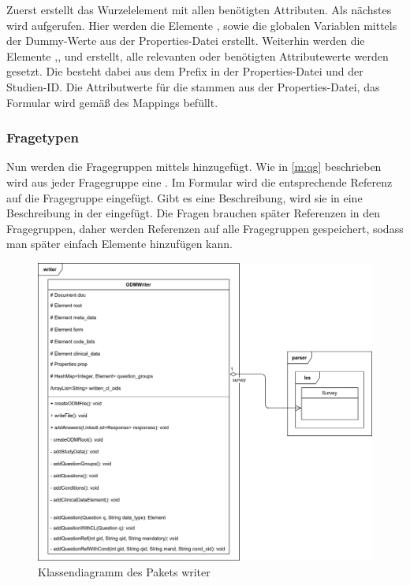 Zuerst erstellt  das Wurzelelement  mit allen benötigten Attributen.
Als nächstes wird  aufgerufen. Hier werden die Elemente , sowie die globalen Variablen mittels der Dummy-Werte aus der Properties-Datei erstellt.
Weiterhin werden die Elemente ,,  und  erstellt, alle relevanten oder benötigten Attributewerte werden gesetzt.
Die  besteht dabei aus dem Prefix in der Properties-Datei und der Studien-ID.
Die Attributwerte für die  stammen aus der Properties-Datei, das Formular wird gemäß des Mappings befüllt.

\subsubsection{Fragetypen}

Nun werden die Fragegruppen mittels  hinzugefügt. Wie in \cref{m:qg} beschrieben wird aus jeder Fragegruppe eine .
Im Formular wird die entsprechende Referenz auf die Fragegruppe eingefügt.
Gibt es eine Beschreibung, wird sie in eine Beschreibung in der  eingefügt.
Die Fragen brauchen später Referenzen in den Fragegruppen, daher werden Referenzen auf alle Fragegruppen gespeichert, sodass man später einfach Elemente hinzufügen kann.

\begin{figure}[h]
	\centering
	\includegraphics[width=.98\textwidth]{./img/cls_writer.png}
	\caption{Klassendiagramm des Pakets writer}
\end{figure}

